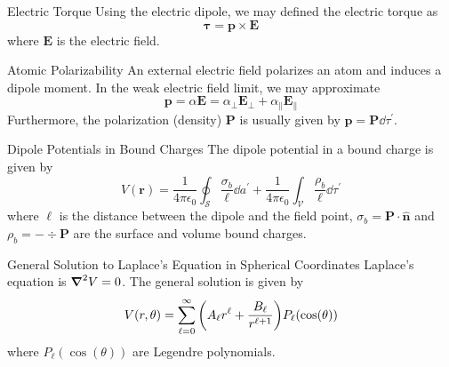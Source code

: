 \documentclass[avery5371,grid]{flashcards}
\begin{document}
\begin{flashcard}[Definition]{Electric Torque}
	Using the electric dipole, we may defined the electric torque as
	\begin{equation*}
		\boldsymbol{\tau} = \mathbf{p}\times\mathbf{E}
	\end{equation*}
	where $\mathbf{E}$ is the electric field.
\end{flashcard}

\begin{flashcard}[Definition]{Atomic Polarizability}
	An external electric field polarizes an atom and induces a dipole moment. In the weak electric field limit, we may approximate
	\begin{equation*}
		\mathbf{p} = \alpha \mathbf{E} = \alpha_\perp\mathbf{E}_{\perp} + \alpha_{\parallel}\mathbf{E}_{\parallel}
	\end{equation*}
	Furthermore, the polarization (density) $\mathbf{P}$ is usually given by $\mathbf{p} = \mathbf{P}\dd\tau^\prime$.
\end{flashcard}

\begin{flashcard}[Definition]{Dipole Potentials in Bound Charges}
	The dipole potential in a bound charge is given by
	\begin{equation*}
		V(\mathbf{r}) = \frac{1}{4\pi\epsilon_0} \oint_{\mathcal{S}}\frac{\sigma_b}{\ell} \dd a^\prime + \frac{1}{4\pi\epsilon_0} \int_{\mathcal{V}} \frac{\rho_b}{\ell}\dd\tau^\prime
	\end{equation*}
	where $\ell$ is the distance between the dipole and the field point, $\sigma_b = \mathbf{P}\cdot\hat{\mathbf{n}}$ and $\rho_b = -\div\mathbf{P}$ are the surface and volume bound charges.
\end{flashcard}

\begin{flashcard}[Definition]{General Solution to Laplace's Equation in Spherical Coordinates}
	Laplace's equation is $\grad^2 V = 0$. The general solution is given by
	\begin{equation}
		V(r,\theta) = \sum_{\ell =0}^\infty\qty(A_\ell r^\ell + \frac{B_{\ell}}{r^{\ell+1}}) P_{\ell}(\cos(\theta))
	\end{equation}
	where $P_\ell(\cos(\theta))$ are Legendre polynomials.
\end{flashcard}

\end{document}
